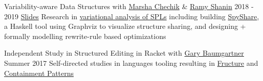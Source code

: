 \documentclass[10pt,a4paper]{article}
\begin{document}
  \headedsubsection
    {Variability-aware Data Structures with \href{https://www.cs.toronto.edu/~chechik/}{Marsha Chechik} \& \href{https://scholar.google.com/citations?user=zrYATWoAAAAJ&hl=en}{Ramy Shanin}}
    {2018 - 2019 \sbull \href{https://github.com/disconcision/vardatalab/blob/master/CSC495_variational_data_structures_slides.pdf}{Slides}}
    {Research in \href{https://github.com/disconcision/vardatalab/blob/master/CSC495_TECHNIQUES_IN_VARIABILITY_AWARE_DATA_STRUCTURES.pdf}{variational analysis of SPLs} including building
    \href{https://github.com/disconcision/spyshare}{SpyShare}, a Haskell tool using Graphviz to visualize structure sharing, and designing + formally modelling rewrite-rule based optimizations}
    
  \headedsubsection
    {Independent Study in Structured Editing in Racket with \href{https://www.cs.toronto.edu/~gfb/}{Gary Baumgartner}}
    {Summer 2017}
    {Self-directed studies in languages tooling resulting in \href{https://github.com/disconcision/fructure}{Fructure} and \href{https://github.com/disconcision/containment-patterns}{Containment Patterns}
    }

    
\end{document}
